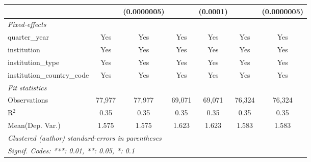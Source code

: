 \begin{tabular}{lcccccc}
                                      &               & (0.0000005)   &               & (0.0001)      &               & (0.0000005)\\   
   \midrule
   \emph{Fixed-effects}\\
   quarter\_year                      & Yes           & Yes           & Yes           & Yes           & Yes           & Yes\\  
   institution                        & Yes           & Yes           & Yes           & Yes           & Yes           & Yes\\  
   institution\_type                  & Yes           & Yes           & Yes           & Yes           & Yes           & Yes\\  
   institution\_country\_code         & Yes           & Yes           & Yes           & Yes           & Yes           & Yes\\  
   \midrule
   \emph{Fit statistics}\\
   Observations                       & 77,977        & 77,977        & 69,071        & 69,071        & 76,324        & 76,324\\  
   R$^2$                              & 0.35          & 0.35          & 0.35          & 0.35          & 0.35          & 0.35\\  
Mean(Dep. Var.) & 1.575 & 1.575 & 1.623 & 1.623 & 1.583 & 1.583 \\
   \midrule \midrule
   \multicolumn{7}{l}{\emph{Clustered (author) standard-errors in parentheses}}\\
   \multicolumn{7}{l}{\emph{Signif. Codes: ***: 0.01, **: 0.05, *: 0.1}}\\
\end{tabular}
\par\endgroup
